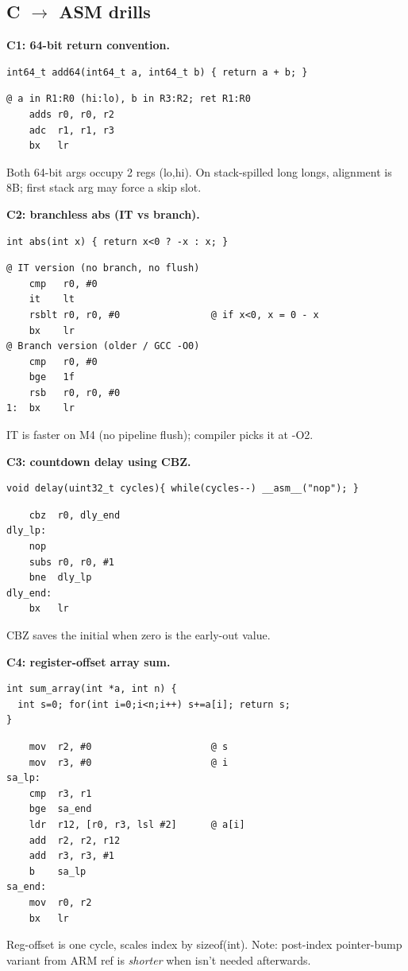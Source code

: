 \subsection{C $\to$ ASM drills}

\textbf{C1: 64-bit return convention.}
\begin{lstlisting}[language={}]
int64_t add64(int64_t a, int64_t b) { return a + b; }
\end{lstlisting}
\begin{lstlisting}
@ a in R1:R0 (hi:lo), b in R3:R2; ret R1:R0
    adds r0, r0, r2
    adc  r1, r1, r3
    bx   lr
\end{lstlisting}
Both 64-bit args occupy 2 regs (lo,hi). On stack-spilled long longs, alignment is 8B; first stack arg may force a skip slot.

\textbf{C2: branchless abs (IT vs branch).}
\begin{lstlisting}[language={}]
int abs(int x) { return x<0 ? -x : x; }
\end{lstlisting}
\begin{lstlisting}
@ IT version (no branch, no flush)
    cmp   r0, #0
    it    lt
    rsblt r0, r0, #0                @ if x<0, x = 0 - x
    bx    lr
@ Branch version (older / GCC -O0)
    cmp   r0, #0
    bge   1f
    rsb   r0, r0, #0
1:  bx    lr
\end{lstlisting}
IT is faster on M4 (no pipeline flush); compiler picks it at -O2.

\textbf{C3: countdown delay using CBZ.}
\begin{lstlisting}[language={}]
void delay(uint32_t cycles){ while(cycles--) __asm__("nop"); }
\end{lstlisting}
\begin{lstlisting}
    cbz  r0, dly_end
dly_lp:
    nop
    subs r0, r0, #1
    bne  dly_lp
dly_end:
    bx   lr
\end{lstlisting}
CBZ saves the initial  when zero is the early-out value.

\textbf{C4: register-offset array sum.}
\begin{lstlisting}[language={}]
int sum_array(int *a, int n) {
  int s=0; for(int i=0;i<n;i++) s+=a[i]; return s;
}
\end{lstlisting}
\begin{lstlisting}
    mov  r2, #0                     @ s
    mov  r3, #0                     @ i
sa_lp:
    cmp  r3, r1
    bge  sa_end
    ldr  r12, [r0, r3, lsl #2]      @ a[i]
    add  r2, r2, r12
    add  r3, r3, #1
    b    sa_lp
sa_end:
    mov  r0, r2
    bx   lr
\end{lstlisting}
Reg-offset \asm{[Rb,Ri,LSL\#2]} is one cycle, scales index by sizeof(int). Note: post-index pointer-bump variant from ARM ref is \emph{shorter} when  isn't needed afterwards.

